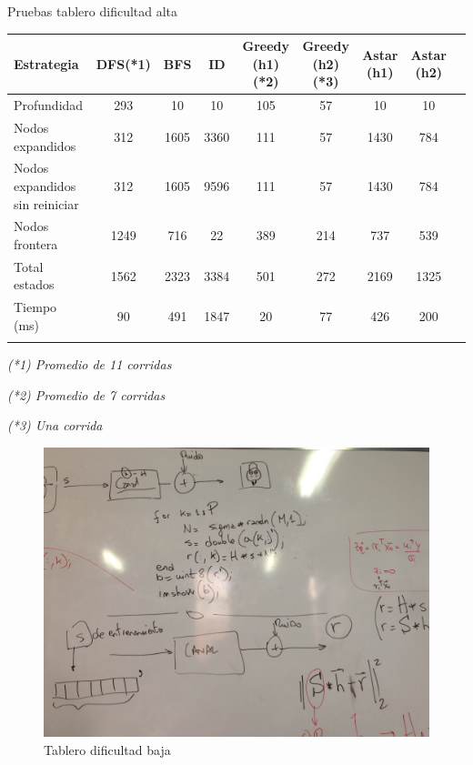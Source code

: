 \documentclass[10pt,journal,compsoc]{IEEEtran}
\begin{document}
Pruebas tablero dificultad alta

\begin{tabular}{l c c c c c c c c}
\hline\hline
Estrategia & DFS(*1) & BFS & ID & Greedy (h1)(*2) & Greedy (h2)(*3) & Astar (h1) & Astar (h2)\\
\hline
Profundidad	 & 293 & 10 & 10 & 105 & 57 & 10 & 10\\
Nodos expandidos 	 & 312 & 1605 & 3360 & 111 & 57 & 1430 & 784\\
Nodos expandidos sin reiniciar & 312 & 1605 & 9596 & 111 & 57 & 1430 & 784\\
Nodos frontera 	& 1249 & 716 & 22 & 389 & 214 & 737 & 539\\
Total estados 	& 1562 & 2323 & 3384 & 501 & 272 & 2169 & 1325\\
Tiempo (ms)		& 90 & 491 & 1847 & 20 & 77 & 426 & 200\\
\hline\hline
\label{board3_conpoda}
\end{tabular}

\textit{(*1) Promedio de 11 corridas}
\par\textit{(*2) Promedio de 7 corridas}
\par\textit{(*3) Una corrida}

\begin{figure}[hp]
\centering
\includegraphics[scale=0.4]{photo1.jpg}
\caption{Tablero dificultad baja}
\label{board1}
\end{figure}
\end{document}
